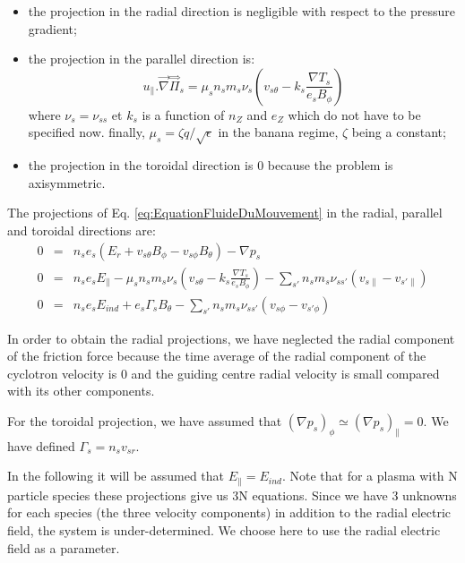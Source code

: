 \begin{itemize}
		\item the projection in the radial direction is negligible with respect to the pressure gradient;
		\item the projection in the parallel direction is:
				\begin{equation}
							u_\|.\vec{\nabla}\stackrel{\Rightarrow}\Pi_s = \mu_s n_s m_s \nu_s \left( v_{s\theta} - k_s \frac{\nabla T_s}{e_s B_\phi} \right)
				\end{equation}
				where $\nu_s = \nu_{ss}$ et $k_s$ is a function of $n_Z$ and $e_Z$ which do not have to be specified now. finally, $\mu_s = \zeta q/\sqrt{\epsilon}$ in the banana regime, $\zeta$ being a constant;
		\item the projection in the toroidal direction is 0 because the problem is axisymmetric.
\end{itemize}

The projections of Eq. \ref{eq:EquationFluideDuMouvement} in the radial, parallel and toroidal directions are:
\begin{eqnarray}
		0	&	=	&	n_s e_s \left( E_r + v_{s\theta} B_\phi - v_{s\phi} B_\theta \right) - \nabla p_s	\label{eq:FluideDuMvt_r}\\
		0	&	=	&	n_s e_s E_\| - \mu_s n_s m_s \nu_s \left( v_{s\theta} - k_s\frac{\nabla T_s}{e_s B_\phi} \right) - \sum_{s'} n_s m_s \nu_{ss'} \left( v_{s\|} - v_{s'\|} \right)	\label{eq:FluideDuMvt_par}		\\
		0	&	=	& n_s e_s E_{ind} + e_s\Gamma_s B_\theta - \sum_{s'} n_s m_s \nu_{ss'} \left( v_{s\phi} - v_{s'\phi} \right)
		\label{eq:FluideDuMvt_tor}
\end{eqnarray}

In order to obtain the radial projections, we have neglected the radial component of the friction force because the time average of the radial component of the cyclotron velocity is 0 and the guiding centre radial velocity is small compared with its other components.

For the toroidal projection, we have assumed that $(\nabla p_s)_\phi \simeq (\nabla p_s)_\| = 0$. We have defined $\Gamma_s = n_s v_{sr}$.

In the following it will be assumed that $E_\| = E_{ind}$. Note that for a plasma with N particle species these projections give us 3N equations. Since we have 3 unknowns for each species (the three velocity components) in addition to the radial electric field, the system is under-determined. We choose here to use the radial electric field as a parameter.

